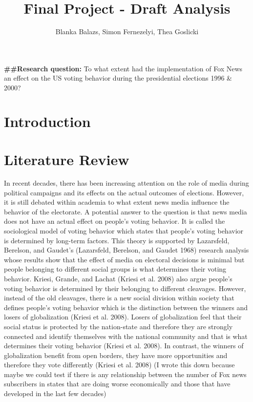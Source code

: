\documentclass[
]{article}
\title{Final Project - Draft Analysis}
\author{Blanka Balazs, Simon Fernezelyi, Thea Goslicki}
\date{}
\begin{document}
\maketitle

{
\hypersetup{linkcolor=}
\setcounter{tocdepth}{2}
\tableofcontents
}
\textbf{\#\#Research question:} To what extent had the implementation of Fox News an effect on the US voting behavior during the presidential elections 1996 \& 2000?

\hypertarget{introduction}{%
\section{\texorpdfstring{\textbf{Introduction}}{Introduction}}\label{introduction}}

\hypertarget{literature-review}{%
\section{Literature Review}\label{literature-review}}

In recent decades, there has been increasing attention on the role of media during political campaigns and its effects on the actual outcomes of elections. However, it is still debated within academia to what extent news media influence the behavior of the electorate. A potential answer to the question is that news media does not have an actual effect on people's voting behavior. It is called the sociological model of voting behavior which states that people's voting behavior is determined by long-term factors. This theory is supported by Lazarsfeld, Berelson, and Gaudet's (Lazarsfeld, Berelson, and Gaudet 1968) research analysis whose results show that the effect of media on electoral decisions is minimal but people belonging to different social groups is what determines their voting behavior. Kriesi, Grande, and Lachat (Kriesi et al. 2008) also argue people's voting behavior is determined by their belonging to different cleavages. However, instead of the old cleavages, there is a new social division within society that defines people's voting behavior which is the distinction between the winners and losers of globalization (Kriesi et al. 2008). Losers of globalization feel that their social status is protected by the nation-state and therefore they are strongly connected and identify themselves with the national community and that is what determines their voting behavior (Kriesi et al. 2008). In contrast, the winners of globalization benefit from open borders, they have more opportunities and therefore they vote differently (Kriesi et al. 2008) (I wrote this down because maybe we could test if there is any relationship between the number of Fox news subscribers in states that are doing worse economically and those that have developed in the last few decades)
\end{document}
